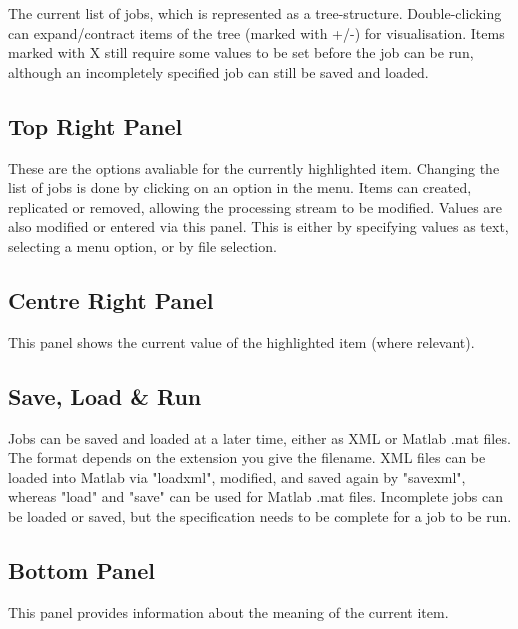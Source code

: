 \documentclass[a4paper,titlepage]{book}
\begin{document}
The current list of jobs, which is represented as a tree-structure. Double-clicking can expand/contract items of the tree (marked with +/-) for visualisation. Items marked with X still require some values to be set before the job can be run, although an incompletely specified job can still be saved and loaded.


\subsection*{Top Right Panel}

These are the options avaliable for the currently highlighted item. Changing the list of jobs is done by clicking on an option in the menu. Items can created, replicated or removed, allowing the processing stream to be modified. Values are also modified or entered via this panel. This is either by specifying values as text, selecting a menu option, or by file selection.


\subsection*{Centre Right Panel}

This panel shows the current value of the highlighted item (where relevant).


\subsection*{Save, Load \& Run}

Jobs can be saved and loaded at a later time, either as XML or Matlab .mat files.  The format depends on the extension you give the filename. XML files can be loaded into Matlab via "loadxml", modified, and saved again by "savexml", whereas "load" and "save" can be used for Matlab .mat files. Incomplete jobs can be loaded or saved, but the specification needs to be complete for a job to be run.


\subsection*{Bottom Panel}

This panel provides information about the meaning of the current item.
\end{document}
